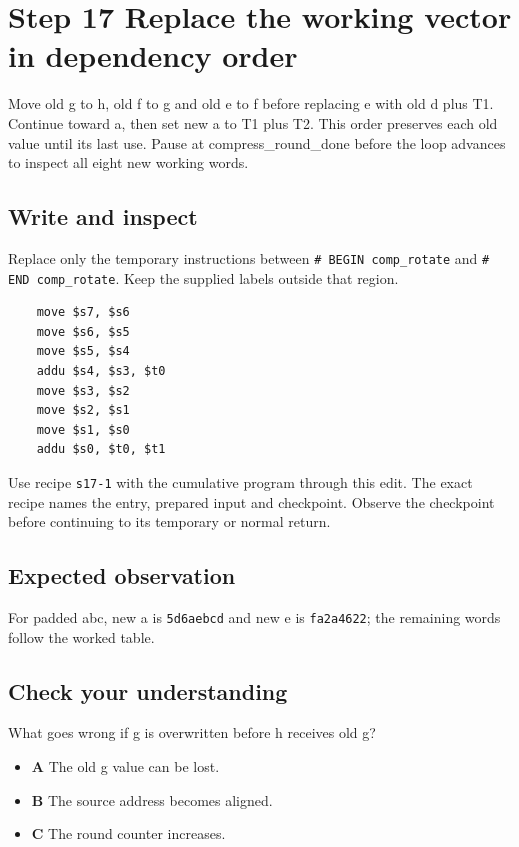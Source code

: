 \section{Step 17 Replace the working vector in dependency order}\label{sha-s17}

Move old g to h, old f to g and old e to f before replacing e with old d plus T1. Continue toward a, then set new a to T1 plus T2. This order preserves each old value until its last use. Pause at compress\_round\_done before the loop advances to inspect all eight new working words.

\subsection{Write and inspect}
Replace only the temporary instructions between \texttt{\# BEGIN comp\_rotate} and \texttt{\# END comp\_rotate}. Keep the supplied labels outside that region.

\begin{verbatim}
    move $s7, $s6
    move $s6, $s5
    move $s5, $s4
    addu $s4, $s3, $t0
    move $s3, $s2
    move $s2, $s1
    move $s1, $s0
    addu $s0, $t0, $t1
\end{verbatim}

Use recipe \texttt{s17-1} with the cumulative program through this edit. The exact recipe names the entry, prepared input and checkpoint. Observe the checkpoint before continuing to its temporary or normal return.

\subsection{Expected observation}
For padded abc, new a is \texttt{5d6aebcd} and new e is \texttt{fa2a4622}; the remaining words follow the worked table.

\subsection{Check your understanding}
What goes wrong if g is overwritten before h receives old g?

\begin{itemize}
  \item \textbf{A} The old g value can be lost.
  \item \textbf{B} The source address becomes aligned.
  \item \textbf{C} The round counter increases.
\end{itemize}
